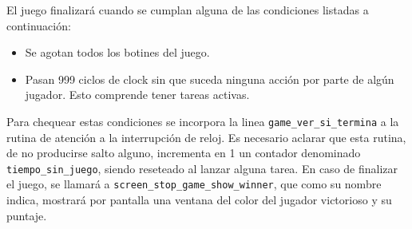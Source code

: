 El juego finalizará cuando se cumplan alguna de las condiciones listadas a continuación:
\begin{itemize}
\item Se agotan todos los botines del juego.
\item Pasan 999 ciclos de clock sin que suceda ninguna acción por parte de algún jugador. Esto comprende tener tareas activas.
\end{itemize}

Para chequear estas condiciones se incorpora la linea {\tt game\_ver\_si\_termina} a la rutina de atención a la interrupción de reloj. Es necesario aclarar que esta rutina, de no producirse salto alguno, incrementa en 1 un contador denominado {\tt tiempo\_sin\_juego}, siendo reseteado al lanzar alguna tarea.
En caso de finalizar el juego, se llamará a {\tt screen\_stop\_game\_show\_winner}, que como su nombre indica, mostrará por pantalla una ventana del color del jugador victorioso y su puntaje. 